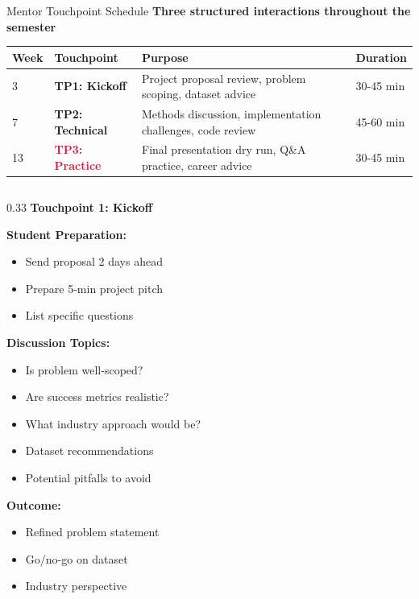 
\begin{frame}{Mentor Touchpoint Schedule}
\textbf{Three structured interactions throughout the semester}

\begin{table}
\centering
\small
\begin{tabular}{|l|l|p{5.5cm}|l|}
\hline
\rowcolor{navyblue!20}
\textbf{Week} & \textbf{Touchpoint} & \textbf{Purpose} & \textbf{Duration} \\
\hline
3 & \textcolor{forest}{\textbf{TP1: Kickoff}} & Project proposal review, problem scoping, dataset advice & 30-45 min \\
\hline
7 & \textcolor{navyblue}{\textbf{TP2: Technical}} & Methods discussion, implementation challenges, code review & 45-60 min \\
\hline
13 & \textcolor{crimson}{\textbf{TP3: Practice}} & Final presentation dry run, Q\&A practice, career advice & 30-45 min \\
\hline
\end{tabular}
\end{table}

\vspace{0.4cm}

\begin{columns}
\begin{column}{0.33\textwidth}
\textbf{Touchpoint 1: Kickoff}

\textcolor{forest}{\textbf{Student Preparation:}}
\begin{itemize}
\item Send proposal 2 days ahead
\item Prepare 5-min project pitch
\item List specific questions
\end{itemize}

\textcolor{forest}{\textbf{Discussion Topics:}}
\begin{itemize}
\item Is problem well-scoped?
\item Are success metrics realistic?
\item What industry approach would be?
\item Dataset recommendations
\item Potential pitfalls to avoid
\end{itemize}

\textcolor{forest}{\textbf{Outcome:}}
\begin{itemize}
\item Refined problem statement
\item Go/no-go on dataset
\item Industry perspective
\end{itemize}
\end{column}


\end{columns}
\end{frame}
